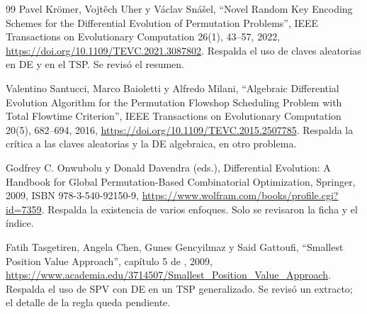 \begin{thebibliography}{99}
Pavel Krömer, Vojtěch Uher y Václav Snášel, ``Novel Random Key Encoding Schemes for the Differential Evolution of Permutation Problems'', IEEE Transactions on Evolutionary Computation 26(1), 43--57, 2022, \url{https://doi.org/10.1109/TEVC.2021.3087802}. Respalda el uso de claves aleatorias en DE y en el TSP. Se revisó el resumen.

Valentino Santucci, Marco Baioletti y Alfredo Milani, ``Algebraic Differential Evolution Algorithm for the Permutation Flowshop Scheduling Problem with Total Flowtime Criterion'', IEEE Transactions on Evolutionary Computation 20(5), 682--694, 2016, \url{https://doi.org/10.1109/TEVC.2015.2507785}. Respalda la crítica a las claves aleatorias y la DE algebraica, en otro problema.

Godfrey C. Onwubolu y Donald Davendra (eds.), Differential Evolution: A Handbook for Global Permutation-Based Combinatorial Optimization, Springer, 2009, ISBN 978-3-540-92150-9, \url{https://www.wolfram.com/books/profile.cgi?id=7359}. Respalda la existencia de varios enfoques. Solo se revisaron la ficha y el índice.

Fatih Tasgetiren, Angela Chen, Gunes Gencyilmaz y Said Gattoufi, ``Smallest Position Value Approach'', capítulo 5 de \cite{de16}, 2009, \url{https://www.academia.edu/3714507/Smallest_Position_Value_Approach}. Respalda el uso de SPV con DE en un TSP generalizado. Se revisó un extracto; el detalle de la regla queda pendiente.

\end{thebibliography}
